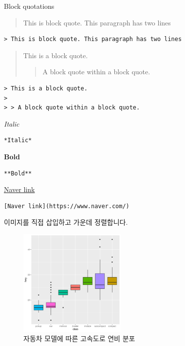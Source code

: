 \documentclass[
]{book}
\begin{document}
Block quotations

\begin{quote}
This is block quote. This paragraph has two lines
\end{quote}

\begin{verbatim}
> This is block quote. This paragraph has two lines
\end{verbatim}

\begin{quote}
This is a block quote.

\begin{quote}
A block quote within a block quote.
\end{quote}
\end{quote}

\begin{verbatim}
> This is a block quote.
>
> > A block quote within a block quote.
\end{verbatim}

\emph{Italic}

\begin{verbatim}
*Italic*
\end{verbatim}

\textbf{Bold}

\begin{verbatim}
**Bold**
\end{verbatim}

\href{https://www.naver.com/}{Naver link}

\begin{verbatim}
[Naver link](https://www.naver.com/)
\end{verbatim}

이미지를 직접 삽입하고 가운데 정렬합니다.

\begin{figure}
\centering
\includegraphics[width=2.08333in,height=\textheight]{images/rmarkdown/000002.png}
\caption{자동차 모델에 따른 고속도로 연비 분포}
\end{figure}
\end{document}
